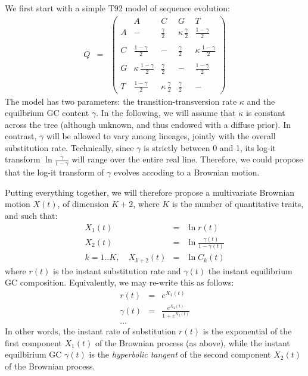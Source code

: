 \documentclass[usletter]{article}
\begin{document}
We first start with a simple T92 model of sequence evolution:
\begin{eqnarray*}
Q &=& 
\left( \begin{array}{r|rrrrr}
&A&C&G&T\\
\hline
A&- &  \frac{\gamma}{2}  & \kappa \, \frac{\gamma}{2} &  \frac{1 - \gamma}{2} \\
\\
C& \frac{1 - \gamma}{2} & - & \frac{\gamma}{2} & \kappa \, \frac{1 - \gamma}{2}  \\
\\
G&\kappa \, \frac{1 - \gamma}{2}  &  \frac{\gamma}{2}  & - & \frac{1 - \gamma}{2}  \\
\\
T& \frac{1 - \gamma}{2} & \kappa \, \frac{\gamma}{2}  &  \frac{\gamma}{2}  & -
\end{array} \right)
\end{eqnarray*}
The model has two parameters: the transition-transversion rate $\kappa$ and the equilbrium GC content $\gamma$. In the following, we will assume that $\kappa$ is constant across the tree (although unknown, and thus endowed with a diffuse prior). In contrast, $\gamma$ will be allowed to vary among lineages, jointly with the overall substitution rate.
Technically, since $\gamma$ is strictly between 0 and 1, its log-it transform $\ln \frac{\gamma}{1 - \gamma}$ will range over the entire real line. Therefore, we could propose that the log-it transform of $\gamma$ evolves accoding to a Brownian motion.

Putting everything together, we will therefore propose a multivariate Brownian motion $X(t)$, of dimension $K+2$, where $K$ is the number of quantitative traits, and such that:
\begin{eqnarray*}
X_1(t) &=& \ln r(t)
\\
X_2(t) &=& \ln \frac{\gamma(t)}{1 - \gamma(t)}
\\
k=1..K, \quad X_{k+2}(t) &=& \ln C_k(t)
\end{eqnarray*}
where $r(t)$ is the instant substitution rate and $\gamma(t)$ the instant equilibrium GC composition.
Equivalently, we may re-write this as follows:
\begin{eqnarray*}
r(t) &=& e^{X_1(t)}
\\
\gamma(t) &=& \frac{e^{X_2(t)}}{1 + e^{X_2(t)}}
\\
\ldots
\end{eqnarray*}
In other words, the instant rate of substitution $r(t)$ is the exponential of the first component $X_1(t)$ of the Brownian process (as above), while the instant equilbirium GC $\gamma(t)$ is the \emph{hyperbolic tangent} of the second component $X_2(t)$ of the Brownian process.
\end{document}
